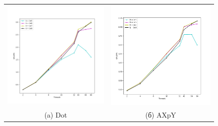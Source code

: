 \documentclass[12pt, a4paper]{article}
\begin{document}
\begin{figure}[H]
	\center
	\begin{tabular}{cc}
		\includegraphics[width=85mm]{multithread_polus_dot} & \includegraphics[width=85mm]{multithread_polus_axpy} \\
		(a) Dot & (б) AXpY \\

\end{tabular}
\end{figure}
\end{document}
